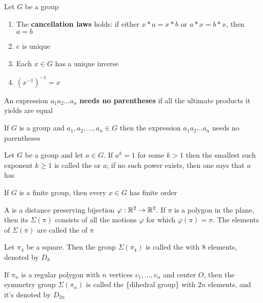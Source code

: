 \documentclass[11pt]{article}
\begin{document}
\begin{lemma}[]
Let \(G\) be a group
\begin{enumerate}
\item The \textbf{cancellation laws} holds: if either \(x*a=x*b\) or \(a*x=b*x\), then
\(a=b\)
\item \(e\) is unique
\item Each \(x\in G\) has a unique inverse
\item \((x^{-1})^{-1}=x\)
\end{enumerate}
\end{lemma}

\begin{definition}[]
An expression \(a_1a_2\dots a_n\) \textbf{needs no parentheses} if all the ultimate
products it yields are equal
\end{definition}

\begin{theorem}
If \(G\) is a group and \(a_1,a_2,\dots,a_n\in G\) then the expression
\(a_1a_2\dots a_n\) needs no parentheses
\end{theorem}

\begin{definition}[]
Let \(G\) be a group and let \(a\in G\). If \(a^k=1\) for some \(k>1\) then the
smallest such exponent \(k\ge 1\) is called the  or \(a\); if no such
power exists, then one says that \(a\) has 
\end{definition}

\begin{proposition}[]
If \(G\) is a finite group, then every \(x\in G\) has finite order
\end{proposition}

\begin{definition}[]
A  is a distance preserving bijection \(\varphi:\mathbb{R}^2\to\mathbb{R}^2\). If
\(\pi\) is a polygon in the plane, then its  \(\Sigma(\pi)\)
consists of all the motions \(\varphi\) for which \(\varphi(\pi)=\pi\). The
elements of \(\Sigma(\pi)\) are called the  of \(\pi\)
\end{definition}

Let \(\pi_4\) be a square. Then the group \(\Sigma(\pi_4)\) is called the
 with 8 elements, denoted by \(D_8\)

\begin{definition}[]
If \(\pi_n\) is a regular polygon with \(n\) vertices \(v_1,\dots,v_n\) and center
\(O\), then the symmetry group \(\Sigma(\pi_n)\) is called the \tf\{dihedral
group\} with \(2n\) elements, and it's denoted by \(D_{2n}\)
\end{definition}
\end{document}

